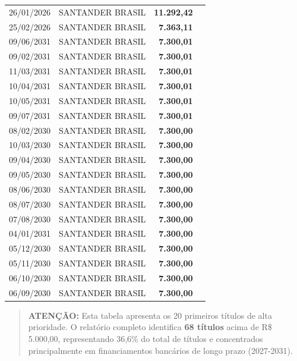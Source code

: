 \documentclass[12pt, a4paper]{article}
\begin{document}
\begin{longtable}{c p{5.5cm} r p{3cm}}
    26/01/2026 & SANTANDER BRASIL & \textcolor{accentColor}{\textbf{11.292,42}} &  \\
    25/02/2026 & SANTANDER BRASIL & \textcolor{accentColor}{\textbf{7.363,11}} &  \\
    09/06/2031 & SANTANDER BRASIL & \textcolor{accentColor}{\textbf{7.300,01}} &  \\
    09/02/2031 & SANTANDER BRASIL & \textcolor{accentColor}{\textbf{7.300,01}} &  \\
    11/03/2031 & SANTANDER BRASIL & \textcolor{accentColor}{\textbf{7.300,01}} &  \\
    10/04/2031 & SANTANDER BRASIL & \textcolor{accentColor}{\textbf{7.300,01}} &  \\
    10/05/2031 & SANTANDER BRASIL & \textcolor{accentColor}{\textbf{7.300,01}} &  \\
    09/07/2031 & SANTANDER BRASIL & \textcolor{accentColor}{\textbf{7.300,01}} &  \\
    08/02/2030 & SANTANDER BRASIL & \textcolor{accentColor}{\textbf{7.300,00}} &  \\
    10/03/2030 & SANTANDER BRASIL & \textcolor{accentColor}{\textbf{7.300,00}} &  \\
    09/04/2030 & SANTANDER BRASIL & \textcolor{accentColor}{\textbf{7.300,00}} &  \\
    09/05/2030 & SANTANDER BRASIL & \textcolor{accentColor}{\textbf{7.300,00}} &  \\
    08/06/2030 & SANTANDER BRASIL & \textcolor{accentColor}{\textbf{7.300,00}} &  \\
    08/07/2030 & SANTANDER BRASIL & \textcolor{accentColor}{\textbf{7.300,00}} &  \\
    07/08/2030 & SANTANDER BRASIL & \textcolor{accentColor}{\textbf{7.300,00}} &  \\
    04/01/2031 & SANTANDER BRASIL & \textcolor{accentColor}{\textbf{7.300,00}} &  \\
    05/12/2030 & SANTANDER BRASIL & \textcolor{accentColor}{\textbf{7.300,00}} &  \\
    05/11/2030 & SANTANDER BRASIL & \textcolor{accentColor}{\textbf{7.300,00}} &  \\
    06/10/2030 & SANTANDER BRASIL & \textcolor{accentColor}{\textbf{7.300,00}} &  \\
    06/09/2030 & SANTANDER BRASIL & \textcolor{accentColor}{\textbf{7.300,00}} &  \\
\end{longtable}

\vspace{-0.3cm}
\begin{quote}
    \footnotesize \textbf{ATENÇÃO:} Esta tabela apresenta os 20 primeiros títulos de alta prioridade. O relatório completo identifica \textbf{68 títulos} acima de R\$ 5.000,00, representando 36,6\% do total de títulos e concentrados principalmente em financiamentos bancários de longo prazo (2027-2031).
\end{quote}
\end{document}
